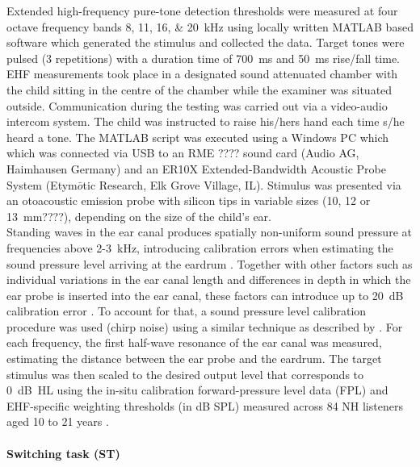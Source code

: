 \documentclass[a4paper, twoside]{templates/ociamthesis}
\begin{document}
Extended high-frequency pure-tone detection thresholds were measured at four octave frequency bands 8, 11, 16, \& 20~kHz using locally written MATLAB based software which generated the stimulus and collected the data. Target tones were pulsed (3 repetitions) with a duration time of 700~ms and 50~ms rise/fall time. EHF measurements took place in a designated sound attenuated chamber with the child sitting in the centre of the chamber while the examiner was situated outside. Communication during the testing was carried out via a video-audio intercom system. The child was instructed to raise his/hers hand each time s/he heard a tone. The MATLAB script was executed using a Windows PC which which was connected via USB to an RME ???? sound card (Audio AG, Haimhausen Germany) and an ER10X Extended-Bandwidth Acoustic Probe System (Etym\(\bar{o}\)tic Research, Elk Grove Village, IL). Stimulus was presented via an otoacoustic emission probe with silicon tips in variable sizes (10, 12 or 13~mm????), depending on the size of the child's ear.\\

Standing waves in the ear canal produces spatially non-uniform sound pressure at frequencies above 2-3~kHz, introducing calibration errors when estimating the sound pressure level arriving at the eardrum \autocite{Siegel1994,Richmond2011,Lee2012}. Together with other factors such as individual variations in the ear canal length and differences in depth in which the ear probe is inserted into the ear canal, these factors can introduce up to 20~dB calibration error \autocite{Siegel1994}. To account for that, a sound pressure level calibration procedure was used (chirp noise) using a similar technique as described by \textcite{Lee2012}. For each frequency, the first half-wave resonance of the ear canal was measured, estimating the distance between the ear probe and the eardrum. The target stimulus was then scaled to the desired output level that corresponds to 0~dB~HL using the in-situ calibration forward-pressure level data (FPL) and EHF-specific weighting thresholds (in dB SPL) measured across 84 NH listeners aged 10 to 21 years \autocite[see Table 1 in][]{Lee2012}.

\hypertarget{switching-task-st}{%
\paragraph{Switching task (ST)}\label{switching-task-st}}
\end{document}
